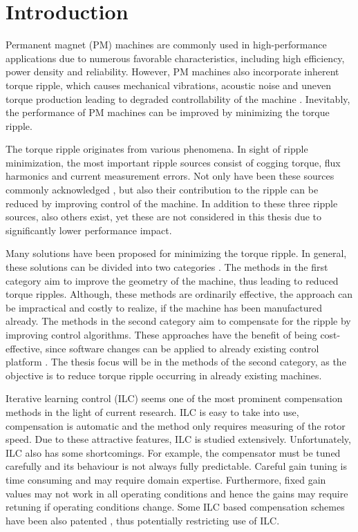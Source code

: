 \section{Introduction}
\thispagestyle{empty}
Permanent magnet (PM) machines are commonly used in high-performance applications due to numerous favorable characteristics, including high efficiency, power density and reliability. However, PM machines also incorporate inherent torque ripple, which causes mechanical vibrations, acoustic noise and uneven torque production leading to degraded controllability of the machine \cite{ILC:2018}. Inevitably, the performance of PM machines can be improved by minimizing the torque ripple.

The torque ripple originates from various phenomena. In sight of ripple minimization, the most important ripple sources consist of cogging torque, flux harmonics and current measurement errors. Not only have been these sources commonly acknowledged \cite{ILC:2005,ILC:2012,CTR_SW:2017,ILC:2018}, but also their contribution to the ripple can be reduced by improving control of the machine. In addition to these three ripple sources, also others exist, yet these are not considered in this thesis due to significantly lower performance impact.

Many solutions have been proposed for minimizing the torque ripple. In general, these solutions can be divided into two categories \cite{CTR_SW:1993, CTR_SW:1998, CTR_SW:2017, ILC:2012, ILC:2018}. The methods in the first category aim to improve the geometry of the machine, thus leading to reduced torque ripples. Although, these methods are ordinarily effective, the approach can be impractical and costly to realize, if the machine has been manufactured already. The methods in the second category aim to compensate for the ripple by improving control algorithms. These approaches have the benefit of being cost-effective, since software changes can be applied to already existing control platform \cite{ILC:2018}. The thesis focus will be in the methods of the second category, as the objective is to reduce torque ripple occurring in already existing machines.

Iterative learning control (ILC) seems one of the most prominent compensation methods in the light of current research. ILC is easy to take into use, compensation is automatic and the method only requires measuring of the rotor speed. Due to these attractive features, ILC is studied extensively. Unfortunately, ILC also has some shortcomings. For example, the compensator must be tuned carefully and its behaviour is not always fully predictable. Careful gain tuning is time consuming and may require domain expertise. Furthermore, fixed gain values may not work in all operating conditions and hence the gains may require retuning if operating conditions change. Some ILC based compensation schemes have been also patented \cite{ILC:patent, ILC:patent2}, thus potentially restricting use of ILC. 

